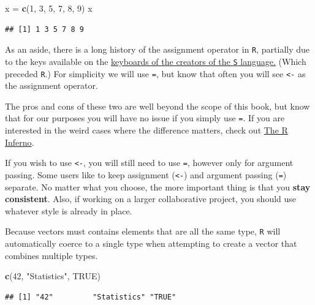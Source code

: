 \documentclass[]{book}
\newenvironment{Shaded}{\begin{snugshade}}{\end{snugshade}}
\newcommand{\KeywordTok}[1]{\textcolor[rgb]{0.13,0.29,0.53}{\textbf{#1}}}
\newcommand{\DecValTok}[1]{\textcolor[rgb]{0.00,0.00,0.81}{#1}}
\newcommand{\StringTok}[1]{\textcolor[rgb]{0.31,0.60,0.02}{#1}}
\newcommand{\OtherTok}[1]{\textcolor[rgb]{0.56,0.35,0.01}{#1}}
\newcommand{\NormalTok}[1]{#1}
\theoremstyle{definition}
\theoremstyle{definition}
\theoremstyle{definition}
\theoremstyle{remark}
\begin{document}
\begin{Shaded}
\begin{Highlighting}[]
\NormalTok{x =}\StringTok{ }\KeywordTok{c}\NormalTok{(}\DecValTok{1}\NormalTok{, }\DecValTok{3}\NormalTok{, }\DecValTok{5}\NormalTok{, }\DecValTok{7}\NormalTok{, }\DecValTok{8}\NormalTok{, }\DecValTok{9}\NormalTok{)}
\NormalTok{x}
\end{Highlighting}
\end{Shaded}

\begin{verbatim}
## [1] 1 3 5 7 8 9
\end{verbatim}

As an aside, there is a long history of the assignment operator in
\texttt{R}, partially due to the keys available on the
\href{https://twitter.com/kwbroman/status/747829864091127809}{keyboards
of the creators of the \texttt{S} language.} (Which preceded
\texttt{R}.) For simplicity we will use \texttt{=}, but know that often
you will see \texttt{\textless{}-} as the assignment operator.

The pros and cons of these two are well beyond the scope of this book,
but know that for our purposes you will have no issue if you simply use
\texttt{=}. If you are interested in the weird cases where the
difference matters, check out
\href{http://www.burns-stat.com/documents/books/the-r-inferno/}{The R
Inferno}.

If you wish to use \texttt{\textless{}-}, you will still need to use
\texttt{=}, however only for argument passing. Some users like to keep
assignment (\texttt{\textless{}-}) and argument passing (\texttt{=})
separate. No matter what you choose, the more important thing is that
you \textbf{stay consistent}. Also, if working on a larger collaborative
project, you should use whatever style is already in place.

Because vectors must contains elements that are all the same type,
\texttt{R} will automatically coerce to a single type when attempting to
create a vector that combines multiple types.

\begin{Shaded}
\begin{Highlighting}[]
\KeywordTok{c}\NormalTok{(}\DecValTok{42}\NormalTok{, }\StringTok{"Statistics"}\NormalTok{, }\OtherTok{TRUE}\NormalTok{)}
\end{Highlighting}
\end{Shaded}

\begin{verbatim}
## [1] "42"         "Statistics" "TRUE"
\end{verbatim}
\end{document}
